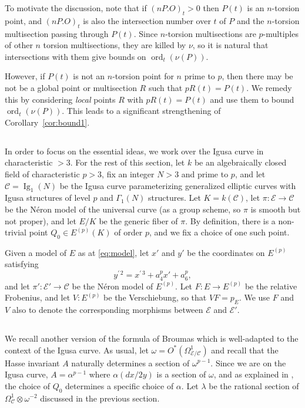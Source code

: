 \documentclass[12pt,reqno]{amsart}
\numberwithin{equation}{section}
\theoremstyle{plain}
\theoremstyle{definition}
\theoremstyle{remark}
\newcommand{\CC}{\mathcal{C}}
\newcommand{\EE}{\mathcal{E}}
\newcommand{\<}{\langle}
\renewcommand{\>}{\rangle}
\newcommand{\tensor}{\otimes}
\DeclareMathOperator{\ord}{ord}
\numberwithin{equation}{section}
\DeclareMathOperator{\Ig}{Ig}
\begin{document}
To motivate the discussion, note that if $(nP.O)_t>0$ then $P(t)$ is
an $n$-torsion point, and $(nP.O)_t$ is also the intersection number
over $t$ of $P$ and the $n$-torsion multisection passing through
$P(t)$.  Since $n$-torsion multisections are $p$-multiples of other
$n$ torsion multisections, they are killed by $\nu$, so it is natural
that intersections with them give bounds on $\ord_t(\nu(P))$.

However, if $P(t)$ is not an $n$-torsion point for $n$ prime to $p$,
then there may be not be a global point or multisection $R$ such that
$pR(t)=P(t)$.  We remedy this by considering \emph{local} points $R$
with $pR(t)=P(t)$ and use them to bound $\ord_t(\nu(P))$.  This leads
to a significant strengthening of Corollary~\ref{cor:bound1}.


\subsection{}
In order to focus on the essential ideas, we work over the Igusa
curve in characteristic $>3$.
For the rest of this section, let $k$ be an algebraically closed field
of characteristic $p>3$, fix an integer $N>3$ and prime to $p$, and
let $\CC=\Ig_1(N)$ be the Igusa curve parameterizing generalized
elliptic curves with Igusa structures of level $p$ and $\Gamma_1(N)$
structures. Let $K=k(\CC)$, let $\pi:\EE\to\CC$ be the N\'eron model
of the universal curve (as a group scheme, so $\pi$ is smooth but not
proper), and let $E/K$ be the generic fiber of $\pi$.  By definition,
there is a non-trivial point $Q_0\in E^{(p)}(K)$ of order $p$, and we
fix a choice of one such point.

Given a model of $E$ as at \eqref{eq:model}, let $x'$ and $y'$ be the
coordinates on $E^{(p)}$ satisfying 
    \[ y^{\prime\,2}=x^{\prime\,3}+a_4^px'+a_6^p,\] %
and let $\pi':\EE'\to\CC$ be the N\'eron model of $E^{(p)}$.  Let
$F:E\to E^{(p)}$ be the relative Frobenius, and let $V:E^{(p)}$ be
the Verschiebung, so that $VF=p_E$.  We use $F$ and $V$ also to
denote the corresponding morphisms between $\EE$ and $\EE'$.

\subsection{}
We recall another version of the formula of Broumas which is
well-adapted to the context of the Igusa curve.  As usual, let
$\omega=O^*(\Omega^1_{\EE/\CC})$ and recall that the Hasse invariant
$A$ naturally determines a section of $\omega^{p-1}$.  Since we are on
the Igusa curve, $A=\alpha^{p-1}$ where $\alpha(dx/2y)$ is a section
of $\omega$, and as explained in \cite[\S3.2]{Broumas97}, the choice
of $Q_0$ determines a specific choice of $\alpha$.  Let $\lambda$ be
the rational section of $\Omega^1_{\CC}\tensor\omega^{-2}$ discussed
in the previous section.
\end{document}
